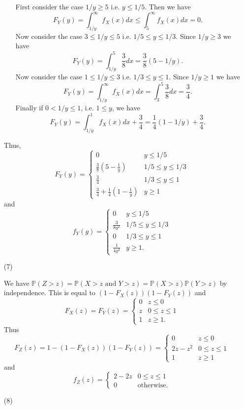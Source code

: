 \documentclass[10pt]{article}
\renewcommand{\P}{\mathbb{P}}
\begin{document}
\begin{enumerate}
\begin{enumerate}[(a)]
First consider the case $1/y \geq 5$ i.e. $y\leq 1/5$. Then we have
\[
F_Y(y) = \int_{1/y}^\infty f_X(x)dx \leq \int_5^\infty f_X(x)dx=0.
\]
Now consider the case $3\leq 1/y\leq 5$ i.e. $1/5\leq y\leq 1/3$.
Since $1/y \geq 3$ we have
\[
F_Y(y) =  \int_{1/y}^5 \frac{3}{8} dx
=\frac{3}{8}(5-1/y).
\]
Now consider the case $1\leq 1/y\leq 3$ i.e. $1/3\leq y\leq 1$.
Since $1/y \geq 1$ we have
\[
F_Y(y) = \int_{1/y}^\infty f_X(x)dx = \int_3^5 \frac{3}{8} dx=\frac{3}{4}.
\]
Finally if $0<1/y\leq 1$, i.e. $1\leq y$, we have
\[
F_Y(y) = \int_{1/y}^1 f_X(x) dx + \frac{3}{4}
= \frac{1}{4}(1-1/y) + \frac{3}{4}.
\]
\end{enumerate}

Thus,
\[
F_Y(y) =
\begin{cases}
0 & y\leq 1/5 \\
\frac{3}{8}(5-\frac{1}{y}) &  1/5 \leq y\leq 1/3 \\
\frac{3}{4} & 1/3 \leq y \leq 1 \\
\frac{3}{4} + \frac{1}{4}(1-\frac{1}{y}) & y\geq 1
\end{cases}
\]
and
\[
f_Y(g) =
\begin{cases}
0 & y\leq 1/5 \\
\frac{3}{8y^2} &  1/5 \leq y\leq 1/3 \\
0 & 1/3 \leq y \leq 1 \\
\frac{1}{4y^2} & y\geq 1.
\end{cases}
\]

\item[(7)]

We have $\P(Z>z) = \P(X>z \text{ and } Y>z)=\P(X>z)\P(Y>z)$ by independence.
This is equal to $(1-F_X(z))(1-F_Y(z))$ and
\[
F_X(z)=F_Y(z) =
\begin{cases}
0 & z\leq 0 \\
z & 0\leq z \leq 1\\
1 & z\geq 1.
\end{cases}
\]
Thus \[
F_Z(z) = 1-(1-F_X(z))(1-F_Y(z)) =
\begin{cases}
0 & z\leq 0 \\
2z-z^2 & 0\leq z \leq 1\\
1 & z\geq 1
\end{cases}
\]
and
\[
f_Z(z) =
\begin{cases}
2 - 2z & 0\leq z \leq 1\\
0 & \text{otherwise}.
\end{cases}
\]

\item[(8)]


\end{enumerate}
\end{document}
